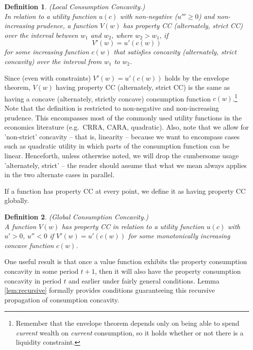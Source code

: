 \documentclass[titlepage]{\econtex}
\newtheorem{defn}{Definition}
\begin{document}
  \begin{defn}\label{defn:IntervalStrictCC} (Local Consumption Concavity.) \\ In relation to a
    utility function $u(c)$ with non-negative ($u''' \geq 0$) and non-increasing prudence, a function $V(w)$ has property CC (alternately, strict CC) over the
    interval between $w_{1}$ and $w_{2}$, where $w_2 >w_{1}$, if
    \[
      V'(w) = u'(c(w))
    \]
    for some increasing function $c(w)$ that satisfies concavity (alternately, strict concavity) over the interval from $w_{1}$ to $w_{2}$.
  \end{defn}
  \noindent Since (even with constraints) $V'(w) = u'(c(w))$ holds by the envelope theorem, $V(w)$ having property CC (alternately, strict CC) is the same as having a concave (alternately, strictly concave) consumption function $c(w)$.\footnote{Remember that the envelope theorem depends only on being able to spend \textit{current} wealth on \textit{current} consumption, so it holds whether or not there is a 	liquidity constraint.} Note that the definition is restricted to non-negative and non-increasing prudence. This encompasses most of the commonly used utility functions in the economics literature (e.g.\ CRRA, CARA, quadratic). Also, note that we allow for 'non-strict' concavity -- that is, linearity -- because we want to encompass cases such as quadratic utility in which parts of the consumption function can be linear.  Henceforth, unless otherwise noted, we will drop the cumbersome usage 'alternately, strict' -- the reader should assume that what we mean always applies in the two alternate cases in parallel.

  If a function has property CC at every point, we define it as having property CC globally.
  \begin{defn}\label{defn:PropCC} (Global Consumption Concavity.) \\  A function $V(w)$ has property CC in relation to a utility function $u(c)$ with $u'>0$, $u''<0$ if $V'(w) = u'(c(w))$ for some monotonically increasing concave function $c(w)$.
  \end{defn}

  \noindent One useful result is that once a value function exhibits the property consumption concavity in some period $t+1$, then it will also have the property consumption concavity in period $t$ and earlier under fairly general conditions. Lemma \ref{lem:recursive} formally provides conditions guaranteeing this recursive propagation of consumption concavity. 
\end{document}
